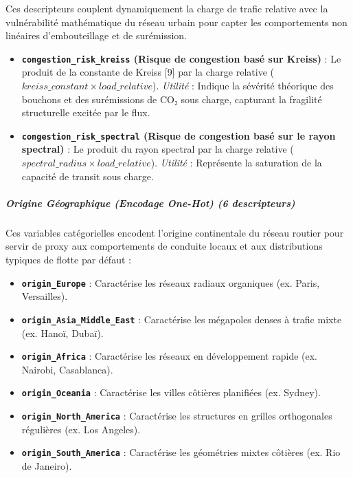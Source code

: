 \documentclass[10pt, a4paper]{article}
\providecommand{\tightlist}{}
\begin{document}
Ces descripteurs couplent dynamiquement la charge de trafic relative
avec la vulnérabilité mathématique du réseau urbain pour capter les
comportements non linéaires d'embouteillage et de surémission.

\begin{itemize}
\tightlist
\item
  \textbf{\texttt{congestion\_risk\_kreiss} (Risque de congestion basé
  sur Kreiss)} : Le produit de la constante de Kreiss {[}9{]} par la
  charge relative (\(kreiss\_constant \times load\_relative\)).
  \emph{Utilité} : Indique la sévérité théorique des bouchons et des
  surémissions de CO₂ sous charge, capturant la fragilité structurelle
  excitée par le flux.
\item
  \textbf{\texttt{congestion\_risk\_spectral} (Risque de congestion basé
  sur le rayon spectral)} : Le produit du rayon spectral par la charge
  relative (\(spectral\_radius \times load\_relative\)). \emph{Utilité}
  : Représente la saturation de la capacité de transit sous charge.
\end{itemize}

\subparagraph{Origine Géographique (Encodage One-Hot) (6
descripteurs)}\label{origine-guxe9ographique-encodage-one-hot-6-descripteurs}

Ces variables catégorielles encodent l'origine continentale du réseau
routier pour servir de proxy aux comportements de conduite locaux et aux
distributions typiques de flotte par défaut :

\begin{itemize}
\tightlist
\item
  \textbf{\texttt{origin\_Europe}} : Caractérise les réseaux radiaux
  organiques (ex. Paris, Versailles).
\item
  \textbf{\texttt{origin\_Asia\_Middle\_East}} : Caractérise les
  mégapoles denses à trafic mixte (ex. Hanoï, Dubaï).
\item
  \textbf{\texttt{origin\_Africa}} : Caractérise les réseaux en
  développement rapide (ex. Nairobi, Casablanca).
\item
  \textbf{\texttt{origin\_Oceania}} : Caractérise les villes côtières
  planifiées (ex. Sydney).
\item
  \textbf{\texttt{origin\_North\_America}} : Caractérise les structures
  en grilles orthogonales régulières (ex. Los Angeles).
\item
  \textbf{\texttt{origin\_South\_America}} : Caractérise les géométries
  mixtes côtières (ex. Rio de Janeiro).
\end{itemize}
\end{document}
